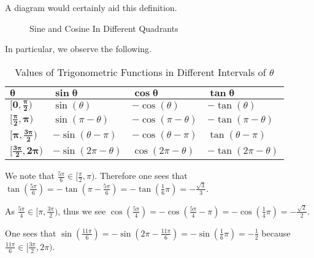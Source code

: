 A diagram would certainly aid this definition.

\begin{figure}[H]
    \centering
    \caption{Sine and Cosine In Different Quadrants}
\end{figure}

In particular, we observe the following.
\begin{table}[H]
    \centering
    \begin{tabular}{|l|l|l|l|}
        \hline
        $\boldsymbol{\theta}$ & $\boldsymbol{\sin\theta}$ & $\boldsymbol{\cos\theta}$ & $\boldsymbol{\tan\theta}$ \\ \hline
        $\boldsymbol{[0,\frac\pi2)}$ & $\sin(\theta)$ & $-\cos(\theta)$ & $-\tan(\theta)$ \\ \hline
        $\boldsymbol{[\frac\pi2, \pi)}$ & $\sin(\pi-\theta)$ & $-\cos(\pi-\theta)$ & $-\tan(\pi-\theta)$ \\ \hline
        $\boldsymbol{[\pi,\frac{3\pi}2)}$ & $-\sin(\theta-\pi)$ & $-\cos(\theta-\pi)$ & $\tan(\theta-\pi)$ \\ \hline
        $\boldsymbol{[\frac{3\pi}2, 2\pi)}$ & $-\sin(2\pi-\theta)$ & $\cos(2\pi-\theta)$ & $-\tan(2\pi-\theta)$ \\ \hline
    \end{tabular}
    \caption{Values of Trigonometric Functions in Different Intervals of $\theta$}
\end{table}

\begin{example}
    We note that $\frac{5\pi}6 \in [\frac\pi2, \pi)$. Therefore one sees that $\tan(\frac{5\pi}{6}) = -\tan(\pi-\frac{5\pi}{6}) = -\tan(\frac16\pi) = -\frac{\sqrt3}3$.
\end{example}

\begin{example}
    As $\frac{5\pi}4 \in [\pi, \frac{3\pi}2)$, thus we see $\cos(\frac{5\pi}4) = -\cos(\frac{5\pi}4-\pi) = -\cos(\frac14\pi) = -\frac{\sqrt2}2$.
\end{example}

\begin{example}
    One sees that $\sin(\frac{11\pi}{6}) = -\sin(2\pi-\frac{11\pi}{6}) = -\sin(\frac16\pi) = -\frac12$ because $\frac{11\pi}{6} \in [\frac{3\pi}2, 2\pi)$.
\end{example}

